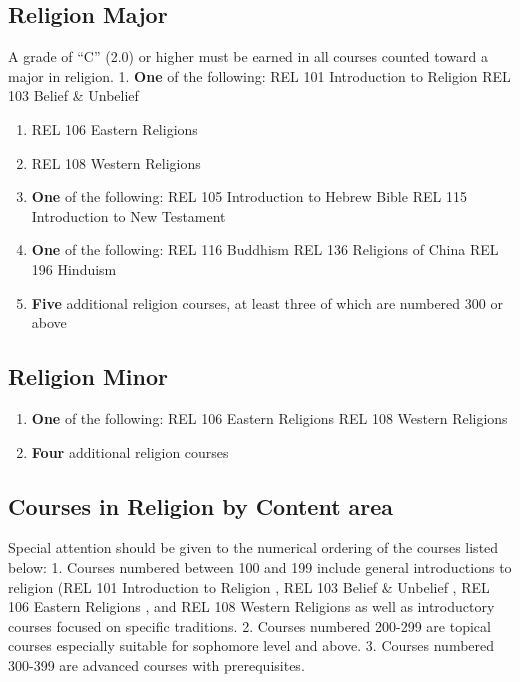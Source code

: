 \documentclass[
  letterpaper,
]{scrbook}
\begin{document}
\hypertarget{religion-major}{%
\subsection{Religion Major}\label{religion-major}}

A grade of ``C'' (2.0) or higher must be earned in all courses counted
toward a major in religion. 1. \textbf{One} of the following: REL 101
Introduction to Religion REL 103 Belief \& Unbelief

\begin{enumerate}
\def\labelenumi{\arabic{enumi}.}
\setcounter{enumi}{1}
\item
  REL 106 Eastern Religions
\item
  REL 108 Western Religions
\item
  \textbf{One} of the following: REL 105 Introduction to Hebrew Bible
  REL 115 Introduction to New Testament
\item
  \textbf{One} of the following: REL 116 Buddhism REL 136 Religions of
  China REL 196 Hinduism
\item
  \textbf{Five} additional religion courses, at least three of which are
  numbered 300 or above
\end{enumerate}

\hypertarget{religion-minor}{%
\subsection{Religion Minor}\label{religion-minor}}

\begin{enumerate}
\def\labelenumi{\arabic{enumi}.}
\item
  \textbf{One} of the following: REL 106 Eastern Religions REL 108
  Western Religions
\item
  \textbf{Four} additional religion courses
\end{enumerate}

\hypertarget{courses-in-religion-by-content-area}{%
\subsection{Courses in Religion by Content
area}\label{courses-in-religion-by-content-area}}

Special attention should be given to the numerical ordering of the
courses listed below: 1. Courses numbered between 100 and 199 include
general introductions to religion (REL 101 Introduction to Religion ,
REL 103 Belief \& Unbelief , REL 106 Eastern Religions , and REL 108
Western Religions as well as introductory courses focused on specific
traditions. 2. Courses numbered 200-299 are topical courses especially
suitable for sophomore level and above. 3. Courses numbered 300-399 are
advanced courses with prerequisites.
\end{document}
